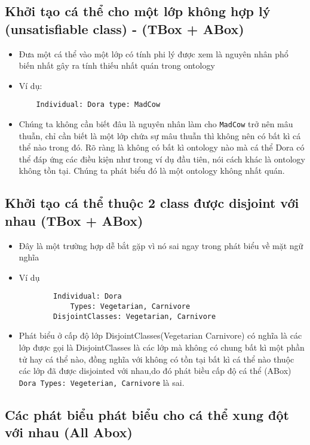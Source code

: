 \subsection{Khởi tạo cá thể cho một lớp không hợp lý (unsatisfiable class) - (TBox + ABox)}
\begin{itemize}

\item{Đưa một cá thể vào một lớp có tính phi lý được xem là nguyên nhân phổ biến nhất gây ra tính thiếu nhất quán trong ontology}
\item{Ví dụ:
\begin{verbatim}
	Individual: Dora type: MadCow
\end{verbatim}
}
\item{
Chúng ta không cần biết đâu là nguyên nhân làm cho \texttt{MadCow} trở nên mâu thuẫn, chỉ cần biết là một lớp chứa sự mâu thuẫn thì không nên có bất kì cá thể nào trong đó. Rõ ràng là không có bất kì ontology nào mà cá thể Dora có thể đáp ứng các điều kiện như trong ví dụ đầu tiên, nói cách khác là ontology không tồn tại. Chúng ta phát biểu đó là một ontology không nhất quán.}
\end{itemize}

\subsection{Khởi tạo cá thể thuộc 2 class được disjoint với nhau (TBox + ABox)}

\begin{itemize}
\item{Đây là một trường hợp dễ bắt gặp vì nó sai ngay trong phát biểu về mặt ngữ nghĩa}
\item Ví dụ
\begin{verbatim}
		Individual: Dora
			Types: Vegetarian, Carnivore
		DisjointClasses: Vegetarian, Carnivore
\end{verbatim}

\item{Phát biểu ở cấp độ lớp DisjointClasses(Vegetarian Carnivore) có nghĩa là các lớp được gọi là DisjointClasses là các lớp mà không có chung bất kì một phần tử hay cá thể nào, đồng nghĩa với không có tồn tại bất kì cá thể nào thuộc các lớp đã được disjointed với nhau,do đó phát biều cấp độ cá thể (ABox) \texttt{Dora  Types: Vegeterian, Carnivore} là sai.}
\end{itemize}  	


\subsection{Các phát biểu phát biểu cho cá thể xung đột với nhau (All Abox)}

